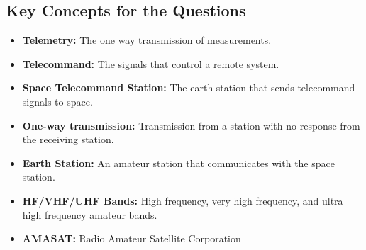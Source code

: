 

\subsection*{Key Concepts for the Questions}
\begin{itemize}
    \item \textbf{Telemetry:} The one way transmission of measurements.
        \item \textbf{Telecommand:} The signals that control a remote system.
    \item \textbf{Space Telecommand Station:} The earth station that sends telecommand signals to space.
    \item \textbf{One-way transmission:} Transmission from a station with no response from the receiving station.
     \item \textbf{Earth Station:} An amateur station that communicates with the space station.
      \item \textbf{HF/VHF/UHF Bands:} High frequency, very high frequency, and ultra high frequency amateur bands.
      \item \textbf{AMASAT:} Radio Amateur Satellite Corporation

\end{itemize}

